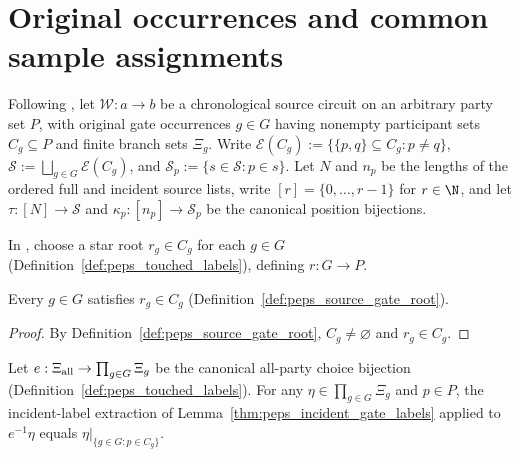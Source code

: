 \section{Original occurrences and common sample assignments}
\label{sec:peps_original_gate_sample_reindexing}

Following \cite[proof of Theorem~5.2]{OpenAI2026PolynomialPEPS}, let
$\mathcal W:a\to b$ be a chronological source circuit on an arbitrary
party set $P$, with original gate occurrences $g\in G$ having nonempty
participant sets $C_g\subseteq P$ and finite branch sets $\Xi_g$.
Write $\mathcal E(C_g):=\{\{p,q\}\subseteq C_g:p\ne q\}$,
$\mathcal S:=\bigsqcup_{g\in G}\mathcal E(C_g)$, and
$\mathcal S_p:=\{s\in\mathcal S:p\in s\}$.
Let $N$ and $n_p$ be the lengths of the ordered full and incident source lists,
write $[r]=\{0,\ldots,r-1\}$ for $r\in\N$, and let
$\tau:[N]\to\mathcal S$ and $\kappa_p:[n_p]\to\mathcal S_p$ be the canonical position bijections.

\begin{definition}
    \label{def:peps_source_gate_root}
    \leanok
    In \cite[proof of Theorem~5.2]{OpenAI2026PolynomialPEPS}, choose a star root $r_g\in C_g$ for each $g\in G$ (Definition~\ref{def:peps_touched_labels}), defining $r:G\to P$.
\end{definition}

\begin{lemma}
    \label{thm:peps_source_gate_root_mem}
    \leanok
    Every $g\in G$ satisfies $r_g\in C_g$ (Definition~\ref{def:peps_source_gate_root}).
\end{lemma}

\begin{proof}
    \leanok
    By Definition~\ref{def:peps_source_gate_root}, $C_g\ne\varnothing$ and $r_g\in C_g$.
\end{proof}

\begin{lemma}
    \label{thm:peps_reindexed_incident_gate_labels}
    \leanok
    Let $e:\Xi_{\rm all}\to\prod_{g\in G}\Xi_g$ be the canonical all-party choice bijection (Definition~\ref{def:peps_touched_labels}). For any $\eta\in\prod_{g\in G}\Xi_g$ and $p\in P$, the incident-label extraction of Lemma~\ref{thm:peps_incident_gate_labels} applied to $e^{-1}\eta$ equals $\eta|_{\{g\in G:p\in C_g\}}$.
\end{lemma}

